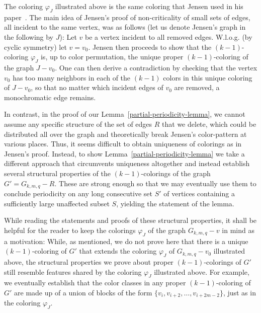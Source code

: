 \documentclass[a4paper,10pt,hidelinks]{amsart}
\renewcommand{\phi}{\ensuremath{\varphi}}
\theoremstyle{definition}
\begin{document}
The coloring $\phi_J$ illustrated above is the same coloring that Jensen used in his paper~\cite{jensen}. The main idea of Jensen's proof of non-criticality of small sets of edges, all incident to the same vertex, was as follows (let us denote Jensen's graph in the following by $J$): Let $v$ be a vertex incident to all removed edges. W.l.o.g. (by cyclic symmetry) let $v=v_0$. Jensen then proceeds to show that the $(k-1)$-coloring $\phi_J$ is, up to color permutation, the unique proper $(k-1)$-coloring of the graph $J-v_0$. One can then derive a contradiction by checking that the vertex $v_0$ has too many neighbors in each of the $(k-1)$ colors in this unique coloring of $J-v_0$, so that no matter which incident edges of $v_0$ are removed, a monochromatic edge remains.

In contrast, in the proof of our Lemma~\ref{partial-periodicity-lemma}, we cannot assume any specific structure of the set of edges $R$ that we delete, which could be distributed all over the graph and theoretically break Jensen's color-pattern at various places. Thus, it seems difficult to obtain uniqueness of colorings as in Jensen's proof. 
Instead, to show Lemma~\ref{partial-periodicity-lemma} we take a different approach that circumvents uniqueness altogether and instead establish several structural properties of the $(k-1)$-colorings of the graph $G'=G_{k,m,q}-R$. These are strong enough so that we may eventually use them to conclude periodicity on any long consecutive set $S'$ of vertices containing a sufficiently large unaffected subset $S$, yielding the statement of the lemma. 

While reading the statements and proofs of these structural properties, it shall be helpful for the reader to keep the colorings $\phi_J$ of the graph $G_{k,m,q}-v$ in mind as a motivation: While, as mentioned, we do not prove here that there is a unique $(k-1)$-coloring of $G'$ that extends the coloring $\phi_J$ of $G_{k,m,q}-v_0$ illustrated above, the structural properties we prove about proper $(k-1)$-colorings of $G'$ still resemble features shared by the coloring $\phi_J$ illustrated above. For example, we eventually establish that the color classes in any proper $(k-1)$-coloring of $G'$ are made up of a union of blocks of the form $\{v_i,v_{i+2},\ldots,v_{i+2m-2}\}$, just as in the coloring $\phi_J$.
\end{document}
